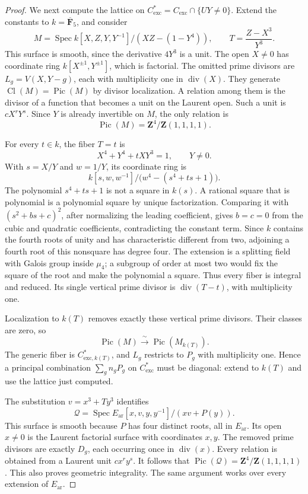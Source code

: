 \documentclass[11pt,a4paper]{amsart}
\numberwithin{equation}{section}
\theoremstyle{definition}
\theoremstyle{remark}
\newcommand{\DtwoZZ}{\mathbf{Z}}
\newcommand{\DtwoFF}{\mathbf{F}}
\newcommand{\DtwocQ}{\mathcal Q}
\newcommand{\Dtwoar}{\mathrm{ar}}
\newcommand{\DtwoSpec}{\operatorname{Spec}}
\DeclareMathOperator{\DtwoPic}{Pic}
\DeclareMathOperator{\DtwoCl}{Cl}
\DeclareMathOperator{\Dtwodivisor}{div}
\begin{document}
\begin{proof}
We next compute the lattice on
\(C_{\mathrm{exc}}^*=C_{\mathrm{exc}}\cap\{UY\ne0\}\).
Extend the constants to \(k=\overline{\DtwoFF}_5\), and consider
\[
 M=\DtwoSpec k[X,Z,Y,Y^{-1}]/(XZ-(1-Y^4)),
 \qquad
 T=\frac{Z-X^3}{Y^3}.
\]
This surface is smooth, since the derivative \(4Y^3\) is a unit.
The open \(X\ne0\) has coordinate ring
\(k[X^{\pm1},Y^{\pm1}]\), which is factorial.
The omitted prime divisors are
\(L_g=V(X,Y-g)\), each with multiplicity one in \(\Dtwodivisor(X)\).
They generate \(\DtwoCl(M)=\DtwoPic(M)\) by divisor localization.
A relation among them is the divisor of a function that becomes a unit
on the Laurent open. Such a unit is \(cX^rY^s\).
Since \(Y\) is already invertible on \(M\), the only relation is
\[
 \DtwoPic(M)=\DtwoZZ^4/\DtwoZZ(1,1,1,1).
\]

For every \(t\in k\), the fiber \(T=t\) is
\[
 X^4+Y^4+tXY^3=1,\qquad Y\ne0.
\]
With \(s=X/Y\) and \(w=1/Y\), its coordinate ring is
\[
 k[s,w,w^{-1}]/\bigl(w^4-(s^4+ts+1)\bigr).
\]
The polynomial \(s^4+ts+1\) is not a square in \(k(s)\).
A rational square that is polynomial is a polynomial square by unique
factorization. Comparing it with \((s^2+bs+c)^2\), after normalizing
the leading coefficient, gives \(b=c=0\) from the cubic and quadratic
coefficients, contradicting the constant term.
Since \(k\) contains the fourth roots of unity and has characteristic
different from two, adjoining a fourth root of this nonsquare has
degree four. The extension is a splitting field with Galois group
inside \(\mu_4\); a subgroup of order at most two would fix the square
of the root and make the polynomial a square.
Thus every fiber is integral and reduced.
Its single vertical prime divisor is \(\Dtwodivisor(T-t)\), with
multiplicity one.

Localization to \(k(T)\) removes exactly these vertical prime
divisors. Their classes are zero, so
\[
 \DtwoPic(M)\xrightarrow{\ \sim\ }\DtwoPic(M_{k(T)}).
\]
The generic fiber is \(C_{\mathrm{exc},k(T)}^*\), and \(L_g\)
restricts to \(P_g\) with multiplicity one.
Hence a principal combination \(\sum_g n_gP_g\) on
\(C_{\mathrm{exc}}^*\) must be diagonal: extend to \(k(T)\) and use
the lattice just computed.

The substitution \(v=x^3+Ty^3\) identifies
\[
 \DtwocQ=\DtwoSpec E_{\Dtwoar}[x,v,y,y^{-1}]/(xv+P(y)).
\]
This surface is smooth because \(P\) has four distinct roots, all in
\(E_{\Dtwoar}\). Its open \(x\ne0\) is the Laurent factorial surface
with coordinates \(x,y\).
The removed prime divisors are exactly \(D_g\), each occurring once
in \(\Dtwodivisor(x)\).
Every relation is obtained from a Laurent unit \(cx^ry^s\).
It follows that
\(\DtwoPic(\DtwocQ)=\DtwoZZ^4/\DtwoZZ(1,1,1,1)\).
This also proves geometric integrality.
The same argument works over every extension of \(E_{\Dtwoar}\).


\end{proof}
\end{document}
